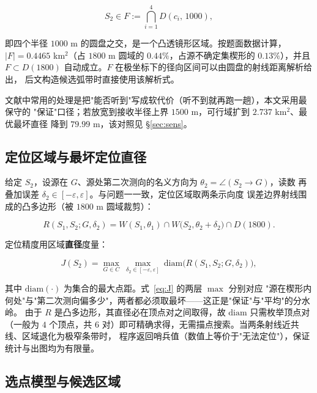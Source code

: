 \begin{equation}
  S_2\in F:=\bigcap_{i=1}^{4}D(c_i,\,1000),
  \label{eq:F}
\end{equation}

即四个半径 $1000$ m 的圆盘之交，是一个凸透镜形区域。按题面数据计算，
$|F|=0.4465$ km$^2$（占 $1800$ m 圆域的 $0.44\%$，占源不确定集楔形的 $0.13\%$），并且
$F\subset D(1800)$ 自动成立。$F$ 在极坐标下的径向区间可以由圆盘的射线距离解析给出，
后文构造候选弧带时直接使用该解析式。

文献中常用的处理是把"能否听到"写成软代价（听不到就再跑一趟），本文采用最保守的
"保证"口径；若放宽到接收半径上界 $1500$ m，可行域扩到 $2.737$ km$^2$、最优最坏直径
降到 $79.99$ m，该对照见 §\ref{sec:sens}。

\subsection{定位区域与最坏定位直径}

给定 $S_2$，设源在 $G$、源处第二次测向的名义方向为 $\theta_2=\angle(S_2\!\to\!G)$，读数
再叠加误差 $\delta_2\in[-\varepsilon,\varepsilon]$。与问题一一致，定位区域取两条示向度
误差边界射线围成的凸多边形（被 $1800$ m 圆域裁剪）：

\begin{equation}
  R(S_1,S_2;G,\delta_2)=W(S_1,\theta_1)\cap W\bigl(S_2,\theta_2+\delta_2\bigr)\cap D(1800).
  \label{eq:region}
\end{equation}

定位精度用区域\textbf{直径}度量：

\begin{equation}
  J(S_2)=\max_{G\in C}\ \max_{\delta_2\in[-\varepsilon,\varepsilon]}
  \ \mathrm{diam}\bigl(R(S_1,S_2;G,\delta_2)\bigr),
  \label{eq:J}
\end{equation}

其中 $\mathrm{diam}(\cdot)$ 为集合的最大点距。式~\eqref{eq:J} 的两层 $\max$ 分别对应
"源在楔形内何处"与"第二次测向偏多少"，两者都必须取最坏——这正是"保证"与"平均"的分水岭。
由于 $R$ 是凸多边形，其直径必在顶点对之间取得，故 $\mathrm{diam}$ 只需枚举顶点对（一般为
$4$ 个顶点，共 $6$ 对）即可精确求得，无需描点搜索。当两条射线近共线、区域退化为极窄条带时，
程序返回哨兵值（数值上等价于"无法定位"），保证统计与出图均为有限量。

\subsection{选点模型与候选区域}


